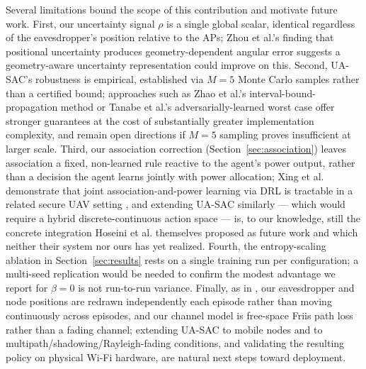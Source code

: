 \documentclass[conference]{IEEEtran}
\begin{document}
Several limitations bound the scope of this contribution and motivate future work. First, our uncertainty signal $\rho$ is a single global scalar, identical regardless of the eavesdropper's position relative to the APs; Zhou et al.'s finding that positional uncertainty produces geometry-dependent angular error \cite{zhou26} suggests a geometry-aware uncertainty representation could improve on this. Second, UA-SAC's robustness is empirical, established via $M=5$ Monte Carlo samples rather than a certified bound; approaches such as Zhao et al.'s interval-bound-propagation method \cite{zhao25} or Tanabe et al.'s adversarially-learned worst case \cite{m2td3} offer stronger guarantees at the cost of substantially greater implementation complexity, and remain open directions if $M=5$ sampling proves insufficient at larger scale. Third, our association correction (Section~\ref{sec:association}) leaves association a fixed, non-learned rule reactive to the agent's power output, rather than a decision the agent learns jointly with power allocation; Xing et al. demonstrate that joint association-and-power learning via DRL is tractable in a related secure UAV setting \cite{xing24}, and extending UA-SAC similarly --- which would require a hybrid discrete-continuous action space --- is, to our knowledge, still the concrete integration Hoseini et al. themselves proposed as future work and which neither their system nor ours has yet realized. Fourth, the entropy-scaling ablation in Section~\ref{sec:results} rests on a single training run per configuration; a multi-seed replication would be needed to confirm the modest advantage we report for $\beta=0$ is not run-to-run variance. Finally, as in \cite{hoseini}, our eavesdropper and node positions are redrawn independently each episode rather than moving continuously across episodes, and our channel model is free-space Friis path loss rather than a fading channel; extending UA-SAC to mobile nodes and to multipath/shadowing/Rayleigh-fading conditions, and validating the resulting policy on physical Wi-Fi hardware, are natural next steps toward deployment.


\end{document}

